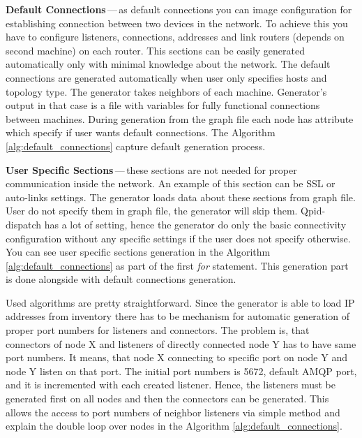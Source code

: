 \begin{description}
	\item \textbf{Default Connections}\,---\,as default connections you can image configuration for establishing connection between two devices in the network. To achieve this you have to configure listeners, connections, addresses and link routers (depends on second machine) on each router. This sections can be easily generated automatically only with minimal knowledge about the network. The default connections are generated automatically when user only specifies hosts and topology type. The generator takes neighbors of each machine. Generator's output in that case is a file with variables for fully functional connections between machines. During generation from the graph file each node has attribute which specify if user wants default connections. The Algorithm \ref{alg:default_connections} capture default generation process.

	\item \textbf{User Specific Sections}\,---\,these sections are not needed for proper communication inside the network. An example of this section can be SSL or auto-links settings. The generator loads data about these sections from graph file. User do not specify them in graph file, the generator will skip them. Qpid-dispatch has a lot of setting, hence the generator do only the basic connectivity configuration without any specific settings if the user does not specify otherwise. You can see user specific sections generation in the Algorithm \ref{alg:default_connections} as part of the first \emph{for} statement. This generation part is done alongside with default connections generation.

\end{description}

Used algorithms are pretty straightforward. Since the generator is able to load IP addresses from inventory there has to be mechanism for automatic generation of proper port numbers for listeners and connectors. The problem is, that connectors of node X and listeners of directly connected node Y has to have same port numbers. It means, that node X connecting to specific port on node Y and node Y listen on that port. The initial port numbers is 5672, default AMQP port, and it is incremented with each created listener. Hence, the listeners must be generated first on all nodes and then the connectors can be generated. This allows the access to port numbers of neighbor listeners via simple method and explain the double loop over nodes in the Algorithm \ref{alg:default_connections}.

